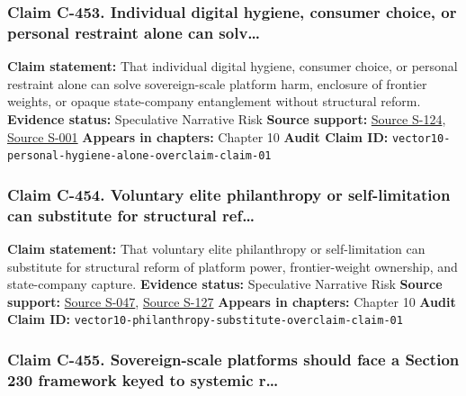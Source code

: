 \documentclass[
  american,
  11pt,
  letterpaper,
]{article}
\begin{document}
\subsubsection{Claim C-453. Individual digital hygiene, consumer choice,
or personal restraint alone can
solv\ldots{}}\label{claim-c-453-individual-digital-hygiene-consumer-choice-or-personal-restraint-alone-can-solv}

\textbf{Claim statement:} That individual digital hygiene, consumer
choice, or personal restraint alone can solve sovereign-scale platform
harm, enclosure of frontier weights, or opaque state-company
entanglement without structural reform. \textbf{Evidence status:}
Speculative Narrative Risk \textbf{Source support:}
\hyperref[source-s-124-artificial-intelligence-and-the-future-of-teaching-and-learning-insights-and-recommendations]{Source
S-124},
\hyperref[source-s-001-interactions-between-artificial-intelligence-and-digital-public-infrastructure-concepts-benefits-and-challenges]{Source
S-001} \textbf{Appears in chapters:} Chapter 10 \textbf{Audit Claim ID:}
\texttt{vector10-personal-hygiene-alone-overclaim-claim-01}

\subsubsection{Claim C-454. Voluntary elite philanthropy or
self-limitation can substitute for structural
ref\ldots{}}\label{claim-c-454-voluntary-elite-philanthropy-or-self-limitation-can-substitute-for-structural-ref}

\textbf{Claim statement:} That voluntary elite philanthropy or
self-limitation can substitute for structural reform of platform power,
frontier-weight ownership, and state-company capture. \textbf{Evidence
status:} Speculative Narrative Risk \textbf{Source support:}
\hyperref[source-s-047-the-adolescence-of-technology]{Source S-047},
\hyperref[source-s-127-encyclical-letter-of-his-holiness-leo-xiv-magnifica-humanitas]{Source
S-127} \textbf{Appears in chapters:} Chapter 10 \textbf{Audit Claim ID:}
\texttt{vector10-philanthropy-substitute-overclaim-claim-01}

\subsubsection{Claim C-455. Sovereign-scale platforms should face a
Section 230 framework keyed to systemic
r\ldots{}}\label{claim-c-455-sovereign-scale-platforms-should-face-a-section-230-framework-keyed-to-systemic-r}
\end{document}
